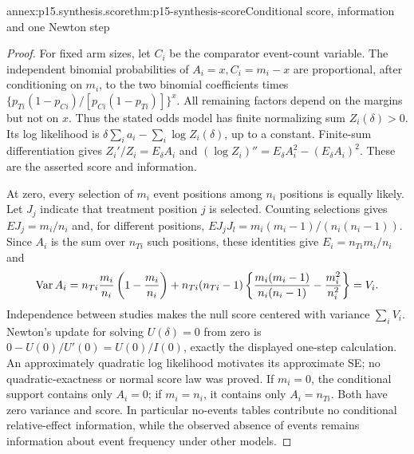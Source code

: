 \begin{annexitem}{annex:p15.synthesis.score}{thm:p15-synthesis-score}{Conditional score, information and one Newton step}
\begin{proof}
For fixed arm sizes, let \(C_i\) be the comparator event-count variable.
The independent binomial probabilities of
\(A_i=x,C_i=m_i-x\) are proportional, after conditioning on \(m_i\),
to the two binomial coefficients times
\(\{p_{Ti}(1-p_{Ci})/[p_{Ci}(1-p_{Ti})]\}^{x}\).
All remaining factors depend on the margins but not on \(x\). Thus the
stated odds model has finite normalizing sum \(Z_i(\delta)>0\).
Its log likelihood is \(\delta\sum_i a_i-\sum_i\log Z_i(\delta)\),
up to a constant. Finite-sum differentiation gives
\(Z_i'/Z_i=E_\delta A_i\) and
\((\log Z_i)''=E_\delta A_i^2-(E_\delta A_i)^2\).
These are the asserted score and information.

At zero, every selection of \(m_i\) event positions among \(n_i\)
positions is equally likely. Let \(J_j\) indicate that treatment position
\(j\) is selected. Counting selections gives
\(EJ_j=m_i/n_i\) and, for different positions,
\(EJ_jJ_l=m_i(m_i-1)/(n_i(n_i-1))\).
Since \(A_i\) is the sum over \(n_{Ti}\) such positions, these identities
give \(E_i=n_{Ti}m_i/n_i\) and
\[
 \operatorname{Var}A_i
 =n_{Ti}{m_i\over n_i}\left(1-{m_i\over n_i}\right)
  +n_{Ti}(n_{Ti}-1)
       \left\{{m_i(m_i-1)\over n_i(n_i-1)}-{m_i^2\over n_i^2}\right\}
 =V_i.
\]
Independence between studies makes the null score centered with variance
\(\sum_i V_i\). Newton's update for solving \(U(\delta)=0\) from
zero is \(0-U(0)/U'(0)=U(0)/I(0)\), exactly the displayed one-step
calculation. An approximately quadratic log likelihood motivates its
approximate SE; no quadratic-exactness or normal score law was proved.
If \(m_i=0\), the conditional support contains only \(A_i=0\);
if \(m_i=n_i\), it contains only \(A_i=n_{Ti}\).
Both have zero variance and score. In particular no-events tables contribute
no conditional relative-effect information, while the observed absence of
events remains information about event frequency under other models.
\end{proof}
\end{annexitem}

